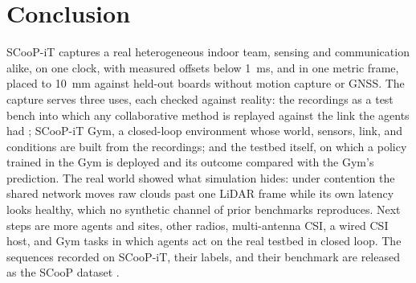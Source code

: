 \section{Conclusion}
\label{sec:conclusion}
SCooP-iT captures a real heterogeneous indoor team, sensing and
communication alike, on one clock, with measured offsets below
\SI{1}{\milli\second}, and in one metric frame, placed to
\SI{10}{\milli\metre} against held-out boards without motion capture or
GNSS. The capture serves three uses, each checked against reality: the
recordings as a test bench into which any collaborative method is
replayed against the link the agents had ; SCooP-iT Gym, a closed-loop environment whose world,
sensors, link, and conditions are built from the recordings; and the
testbed itself, on which a policy trained in the Gym is deployed and
its outcome compared with the Gym's prediction. The real world showed
what simulation hides: under contention the shared network moves raw
clouds past one LiDAR frame while its own latency looks healthy, which
no synthetic channel of prior benchmarks reproduces. Next steps are more
agents and sites, other radios, multi-antenna CSI, a wired CSI host, and
Gym tasks in which agents act on the real testbed in closed loop. The
sequences recorded on SCooP-iT, their labels, and their benchmark are
released as the SCooP dataset \cite{scoop_dataset}.
